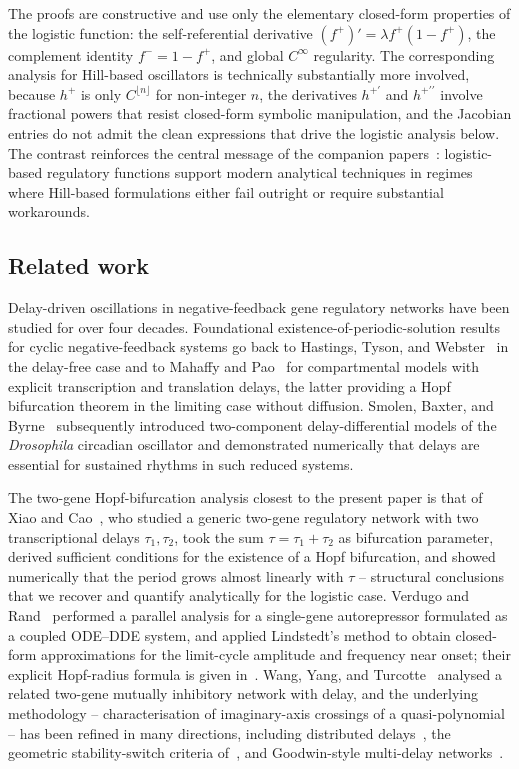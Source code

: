 \documentclass[sn-mathphys,Numbered]{sn-jnl}
\theoremstyle{thmstyleone}
\theoremstyle{thmstyletwo}
\theoremstyle{thmstylethree}
\begin{document}
The proofs are constructive and use only the elementary closed-form
properties of the logistic function: the self-referential derivative
$(f^+)' = \lambda f^+(1-f^+)$, the complement identity
$f^- = 1-f^+$, and global $C^\infty$ regularity. The corresponding analysis
for Hill-based oscillators is technically substantially more involved,
because $h^+$ is only $C^{\lfloor n\rfloor}$ for non-integer $n$, the
derivatives $h^{+\prime}$ and $h^{+\prime\prime}$ involve fractional powers
that resist closed-form symbolic manipulation, and the Jacobian entries do
not admit the clean expressions that drive the logistic analysis below. The
contrast reinforces the central message of the companion
papers~\cite{belgacem2025exploring, belgacem2026logistic}: logistic-based regulatory functions
support modern analytical techniques in regimes where Hill-based
formulations either fail outright or require substantial workarounds.

\subsection{Related work}
\label{sec:related}

Delay-driven oscillations in negative-feedback gene regulatory networks
have been studied for over four decades. Foundational
existence-of-periodic-solution results for cyclic negative-feedback
systems go back to Hastings, Tyson, and
Webster~\cite{hastings1977existence} in the delay-free case and to
Mahaffy and Pao~\cite{mahaffy1984models} for compartmental models with explicit
transcription and translation delays, the latter providing a Hopf
bifurcation theorem in the limiting case without diffusion. Smolen,
Baxter, and Byrne~\cite{smolen2002reduced} subsequently introduced
two-component delay-differential models of the \emph{Drosophila}
circadian oscillator and demonstrated numerically that delays are
essential for sustained rhythms in such reduced systems.

The two-gene Hopf-bifurcation analysis closest to the present paper is
that of Xiao and Cao~\cite{xiao2008genetic}, who studied a generic
two-gene regulatory network with two transcriptional delays
$\tau_1,\tau_2$, took the sum $\tau=\tau_1+\tau_2$ as bifurcation
parameter, derived sufficient conditions for the existence of a Hopf
bifurcation, and showed numerically that the period grows almost
linearly with $\tau$ -- structural conclusions that we recover and
quantify analytically for the logistic case. Verdugo and
Rand~\cite{verdugo2008hopf} performed a parallel analysis for a
single-gene autorepressor formulated as a coupled ODE--DDE system, and
applied Lindstedt's method to obtain closed-form approximations for the
limit-cycle amplitude and frequency near onset; their explicit
Hopf-radius formula is given in~\cite{rand2007hopf}. Wang, Yang, and
Turcotte~\cite{wang2020dynamic} analysed a related two-gene mutually
inhibitory network with delay, and the underlying methodology --
characterisation of imaginary-axis crossings of a quasi-polynomial -- has
been refined in many directions, including distributed
delays~\cite{macdonald1989biological}, the geometric stability-switch
criteria of~\cite{beretta2002geometric}, and Goodwin-style multi-delay
networks~\cite{huang2015hopf}.
\end{document}
